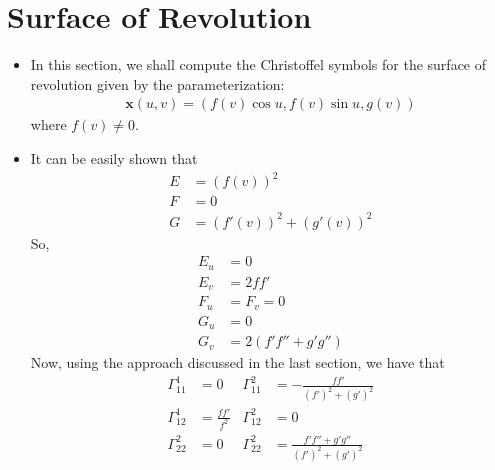 \documentclass[10pt]{article}
\newcommand{\ve}[1]{\mathbf{#1}}
\begin{document}
  \section{Surface of Revolution}

  \begin{itemize}
    \item In this section, we shall compute the Christoffel symbols for the surface of revolution given by the parameterization:
    \begin{align*}
      \ve{x}(u,v) = (f(v) \cos u, f(v) \sin u, g(v))
    \end{align*}
    where $f(v) \neq 0$.

    \item It can be easily shown that
    \begin{align*}
      E &= (f(v))^2\\
      F &= 0\\
      G &= (f'(v))^2 + (g'(v))^2
    \end{align*}
    So,
    \begin{align*}
      E_u &= 0\\
      E_v &= 2ff'\\
      F_u &= F_v = 0\\
      G_u &= 0\\
      G_v &= 2(f'f'' + g'g'')
    \end{align*}
    Now, using the approach discussed in the last section, we have that
    \begin{align*}
      \Gamma_{11}^1 &= 0 & \Gamma_{11}^2 &= - \frac{ff'}{(f')^2 + (g')^2}\\
      \Gamma_{12}^1 &= \frac{ff'}{f^2} & \Gamma_{12}^2 &= 0\\
      \Gamma_{22}^2 &= 0 & \Gamma_{22}^2 &= \frac{f'f''+g'g''}{(f')^2 + (g')^2}
    \end{align*}
  \end{itemize}
\end{document}

